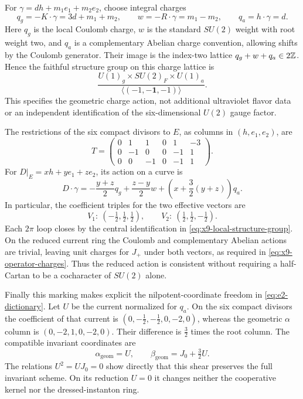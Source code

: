 For $\gamma=d h+m_1e_1+m_2e_2$, choose integral charges
\begin{equation}
 q_g=-K\cdot\gamma=3d+m_1+m_2,\qquad
 w=-R\cdot\gamma=m_1-m_2,\qquad q_a=h\cdot\gamma=d.
 \label{eq:x9-local-integral-charges}
\end{equation}
Here $q_g$ is the local Coulomb charge, $w$ is the standard $SU(2)$
weight with root weight two, and $q_a$ is a complementary Abelian
charge convention, allowing shifts by the Coulomb generator. Their
image is the index-two lattice $q_g+w+q_a\in2\mathbb Z$. Hence the
faithful structure group on this charge lattice is
\begin{equation}
 \frac{U(1)_g\times SU(2)_F\times U(1)_a}
 {\langle(-1,-\mathbf1,-1)\rangle}.
 \label{eq:x9-local-structure-group}
\end{equation}
This specifies the geometric charge action, not additional ultraviolet
flavor data or an independent identification of the six-dimensional
$U(2)$ gauge factor.

The restrictions of the six compact divisors to $E$, as columns in
$(h,e_1,e_2)$, are
\begin{equation}
 T=\begin{pmatrix}
 0&1&1&0&1&-3\\0&-1&0&0&-1&1\\0&0&-1&0&-1&1
 \end{pmatrix}.
 \label{eq:x9-full-restriction}
\end{equation}
For $D|_E=xh+ye_1+ze_2$, its action on a curve is
\begin{equation}
 D\cdot\gamma
 =-\frac{y+z}{2}q_g+\frac{z-y}{2}w
  +\left(x+\frac32(y+z)\right)q_a.
 \label{eq:x9-full-local-action}
\end{equation}
In particular, the coefficient triples for the two effective vectors are
\begin{equation}
 V_1:\ (-\tfrac12,\tfrac12,\tfrac12),\qquad
 V_2:\ (\tfrac12,\tfrac12,-\tfrac12).
 \label{eq:x9-cocharacter-lifts}
\end{equation}
Each $2\pi$ loop closes by the central identification in
\eqref{eq:x9-local-structure-group}. On the reduced current ring the
Coulomb and complementary Abelian actions are trivial, leaving unit
charges for $J_+$ under both vectors, as required in
\eqref{eq:x9-operator-charges}. Thus the reduced action is consistent
without requiring a half-Cartan to be a cocharacter of $SU(2)$ alone.

Finally this marking makes explicit the nilpotent-coordinate freedom
in \eqref{eq:e2-dictionary}. Let $U$ be the current normalized for
$q_a$. On the six compact divisors the coefficient of that current is
$(0,-\tfrac12,-\tfrac12,0,-2,0)$, whereas the geometric
$\alpha$ column is $(0,-2,1,0,-2,0)$. Their difference is
$\tfrac32$ times the root column. The compatible invariant coordinates are
\begin{equation}
 \alpha_{\mathrm{geom}}=U,\qquad
 \beta_{\mathrm{geom}}=J_0+\tfrac32U.
 \label{eq:x9-nilpotent-marking}
\end{equation}
The relations $U^2=UJ_0=0$ show directly that this shear preserves the
full invariant scheme. On its reduction $U=0$ it changes neither the
cooperative kernel nor the dressed-instanton ring.


